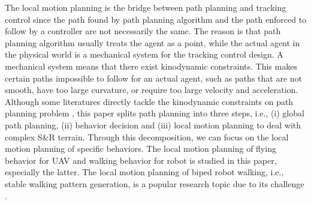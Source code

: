 \documentclass{ieeeaccess}
\begin{document}

The local motion planning is the bridge between path planning and tracking control since the path found by path planning algorithm and the path enforced to follow by a controller are not necessarily the same. The reason is that path planning algorithm usually treats the agent as a point, while the actual agent in the physical world is a mechanical system for the tracking control design. A mechanical system means that there exist kinodynamic constraints. This makes certain paths impossible to follow for an actual agent, such as paths that are not smooth, have too large curvature, or require too large velocity and acceleration. Although some literatures directly tackle the kinodynamic constraints on path planning problem \cite{9384209}, this paper splits path planning into three steps, i.e., (i) global path planning, (ii) behavior decision and (iii) local motion planning to deal with complex S\&R terrain. Through this decomposition, we can focus on the local motion planning of specific behaviors. The local motion planning of flying behavior for UAV and walking behavior for robot is studied in this paper, especially the latter. The local motion planning of biped robot walking, i.e., stable walking pattern generation, is a popular research topic due to its challenge \cite{olcay2017design}.
\end{document}
